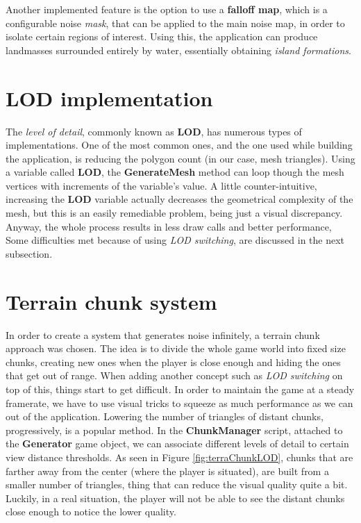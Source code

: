 Another implemented feature is the option to use a \textbf{falloff map}, which is a configurable noise \textit{mask}, that can be applied to the main noise map, in order to isolate certain regions of interest. Using this, the application can produce landmasses surrounded entirely by water, essentially obtaining \textit{island formations}.

\section{LOD implementation}

The \textit{level of detail}, commonly known as \textbf{LOD}, has numerous types of implementations. One of the most common ones, and the one used while building the application, is reducing the polygon count (in our case, mesh triangles). Using a variable called \textbf{LOD}, the \textbf{GenerateMesh} method can loop though the mesh vertices with increments of the variable's value. A little counter-intuitive, increasing the \textbf{LOD} variable actually decreases the geometrical complexity of the mesh, but this is an easily remediable problem, being just a visual discrepancy. Anyway, the whole process results in less draw calls and better performance, Some difficulties met because of using \textit{LOD switching}, are discussed in the next subsection.

\section{Terrain chunk system}

In order to create a system that generates noise infinitely, a terrain chunk approach was chosen. The idea is to divide the whole game world into fixed size chunks, creating new ones when the player is close enough and hiding the ones that get out of range. When adding another concept such as \textit{LOD switching} on top of this, things start to get difficult. In order to maintain the game at a steady framerate, we have to use visual tricks to squeeze as much performance as we can out of the application. Lowering the number of triangles of distant chunks, progressively, is a popular method. In the \textbf{ChunkManager} script, attached to the \textbf{Generator} game object, we can associate different levels of detail to certain view distance thresholds. As seen in Figure \ref{fig:terraChunkLOD}, chunks that are farther away from the center (where the player is situated), are built from a smaller number of triangles, thing that can reduce the visual quality quite a bit. Luckily, in a real situation, the player will not be able to see the distant chunks close enough to notice the lower quality.

